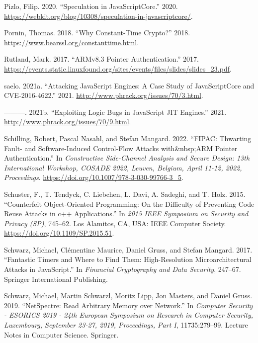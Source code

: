 \documentclass[
  a4paper,
]{report}
\newlength{\cslhangindent}
\newenvironment{CSLReferences}[2] %
{\begin{list}{}{%
	\setlength{\itemindent}{0pt}
	\setlength{\leftmargin}{0pt}
	\setlength{\parsep}{0pt}
	\ifodd #1
	\setlength{\leftmargin}{\cslhangindent}
	\setlength{\itemindent}{-1\cslhangindent}
	\fi
	\setlength{\itemsep}{#2\baselineskip}}}
{\end{list}}
\begin{document}
\begin{CSLReferences}{1}{0}
Pizlo, Filip. 2020. {``Speculation in JavaScriptCore.''} 2020.
\url{https://webkit.org/blog/10308/speculation-in-javascriptcore/}.

Pornin, Thomas. 2018. {``Why Constant-Time Crypto?''} 2018.
\url{https://www.bearssl.org/constanttime.html}.

Rutland, Mark. 2017. {``ARMv8.3 Pointer Authentication.''} 2017.
\url{https://events.static.linuxfound.org/sites/events/files/slides/slides_23.pdf}.

saelo. 2021a. {``Attacking JavaScript Engines: A Case Study of
JavaScriptCore and CVE-2016-4622.''} 2021.
\url{http://www.phrack.org/issues/70/3.html}.

---------. 2021b. {``Exploiting Logic Bugs in JavaScript JIT Engines.''}
2021. \url{http://www.phrack.org/issues/70/9.html}.

Schilling, Robert, Pascal Nasahl, and Stefan Mangard. 2022. {``FIPAC:
Thwarting Fault- and Software-Induced Control-Flow Attacks
with\&nbsp;ARM Pointer Authentication.''} In \emph{Constructive
Side-Channel Analysis and Secure Design: 13th International Workshop,
COSADE 2022, Leuven, Belgium, April 11-12, 2022, Proceedings}.
\url{https://doi.org/10.1007/978-3-030-99766-3_5}.

Schuster, F., T. Tendyck, C. Liebchen, L. Davi, A. Sadeghi, and T. Holz.
2015. {``Counterfeit Object-Oriented Programming: On the Difficulty of
Preventing Code Reuse Attacks in c++ Applications.''} In \emph{2015 IEEE
Symposium on Security and Privacy (SP)}, 745--62. Los Alamitos, CA, USA:
IEEE Computer Society. \url{https://doi.org/10.1109/SP.2015.51}.

Schwarz, Michael, Clémentine Maurice, Daniel Gruss, and Stefan Mangard.
2017. {``Fantastic Timers and Where to Find Them: High-Resolution
Microarchitectural Attacks in {JavaScript}.''} In \emph{Financial
Cryptography and Data Security}, 247--67. Springer International
Publishing.

Schwarz, Michael, Martin Schwarzl, Moritz Lipp, Jon Masters, and Daniel
Gruss. 2019. {``NetSpectre: Read Arbitrary Memory over Network.''} In
\emph{Computer Security - {ESORICS} 2019 - 24th European Symposium on
Research in Computer Security, Luxembourg, September 23-27, 2019,
Proceedings, Part {I}}, 11735:279--99. Lecture Notes in Computer
Science. Springer.


\end{CSLReferences}
\end{document}
